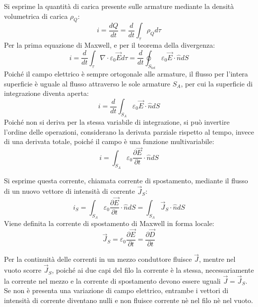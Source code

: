 \documentclass{article}
\numberwithin{equation}{subsection}
\begin{document}
Si esprime la quantità di carica presente sulle armature mediante la densità volumetrica di carica $\rho_Q$:
\begin{equation*}
    i=\displaystyle\frac{dQ}{dt}=\frac{d}{dt}\int_{\tau}\rho_Qd\tau
\end{equation*}
Per la prima equazione di Maxwell, e per il teorema della divergenza: 
\begin{equation*}
    i=\displaystyle\frac{d}{dt}\int_{\tau}\nabla\cdot\varepsilon_0\vec{E}d\tau=\frac{d}{dt}\oint_{S_{tot}}\varepsilon_0\vec{E}\cdot\hat{n}dS
\end{equation*}
Poiché il campo elettrico è sempre ortogonale alle armature, il flusso per l'intera superficie è uguale al flusso attraverso le sole armature $S_A$, per cui la superficie 
di integrazione diventa aperta:
\begin{equation*}
    i=\displaystyle\frac{d}{dt}\int_{S_A}\varepsilon_0\vec{E}\cdot\hat{n}dS
\end{equation*}
Poiché non si deriva per la stessa variabile di integrazione, si può invertire l'ordine delle operazioni, considerano la derivata parziale rispetto al tempo, invece di una 
derivata totale, poiché il campo è una funzione multivariabile:
\begin{equation*}
    i=\displaystyle\int_{S_A}\varepsilon_0\frac{\partial \vec{E}}{\partial t}\cdot\hat{n}dS
\end{equation*}

Si esprime questa corrente, chiamata corrente di spostamento, mediante il flusso di un nuovo vettore di intensità di corrente $\vec{J}_S$:
\begin{equation*}
    i_S=\displaystyle\int_{S_A}\varepsilon_0\frac{\partial \vec{E}}{\partial t}\cdot\hat{n}dS=\int_{S_A}\vec{J}_S\cdot\hat{n}dS
\end{equation*}
Viene definita la corrente di spostamento di Maxwell in forma locale:
\begin{equation}
    \vec{J}_S=\displaystyle\varepsilon_0\frac{\partial \vec{E}}{\partial t}=\frac{\partial \vec{D}}{\partial t}
\end{equation}

Per la continuità delle correnti in un mezzo conduttore fluisce $\vec{J}$, mentre nel vuoto scorre $\vec{J}_S$, poiché ai due capi del filo la corrente è la stessa, necessariamente 
la corrente nel mezzo e la corrente di spostamento devono essere uguali $\vec{J}=\vec{J}_S$. Se non è presenta una variazione di campo elettrico, entrambe i vettori 
di intensità di corrente diventano nulli e non fluisce corrente nè nel filo nè nel vuoto.  
\end{document}
